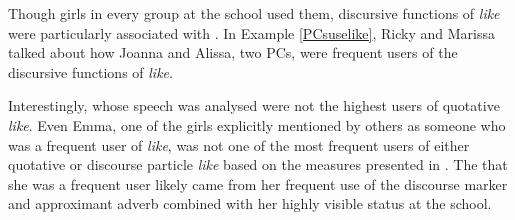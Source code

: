 \label{momdoesnotlikelike}
\vspace{5 mm}


\noindent Though girls in every group at the school used them, discursive functions of \textit{like} were particularly associated with .  In Example \ref{PCsuselike}, Ricky and Marissa talked about how Joanna and Alissa, two PCs, were frequent users of the discursive functions of \textit{like}.

\label{PCsuselike}
\vspace{5 mm}


\noindent Interestingly,  whose speech was analysed were not the highest users of quotative \textit{like}. Even Emma, one of the girls explicitly mentioned by others as someone who was a frequent user of \textit{like}, was not one of the most frequent users of either quotative or discourse particle \textit{like} based on the measures presented in . The  that she was a frequent user likely came from her frequent use of the discourse marker and approximant adverb combined with her highly visible status at the school. 

